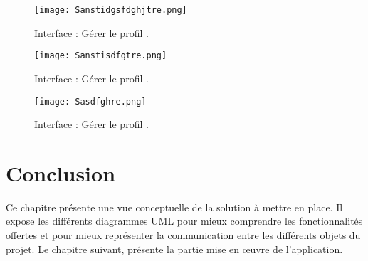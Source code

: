 \begin{figure}[ht]
	\centering
	\texttt{[image: Sanstidgsfdghjtre.png]}
	\caption{Interface : Gérer le profil .}
	\label{fig:Interface : Gérer le profil }
\end{figure}
\FloatBarrier

\begin{figure}[ht]
	\centering
	\texttt{[image: Sanstisdfgtre.png]}
	\caption{Interface : Gérer le profil .}
	\label{fig:Interface : Gérer le profil }
\end{figure}
\FloatBarrier



\begin{figure}[ht]
	\centering
	\texttt{[image: Sasdfghre.png]}
	\caption{Interface : Gérer le profil .}
	\label{fig:Interface : Gérer le profil }
\end{figure}
\FloatBarrier
\clearpage

\section{Conclusion}

Ce chapitre présente une vue conceptuelle de la solution à mettre en place. Il expose les différents diagrammes UML pour mieux comprendre les fonctionnalités offertes et pour mieux représenter la communication entre les différents objets du projet. Le chapitre suivant, présente la partie mise en œuvre de l’application.


